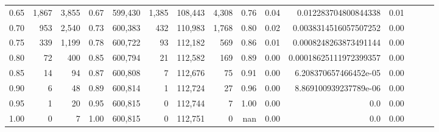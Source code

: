 \begin{tabular}{rrrrrrrrrrrrrrr}
0.65 &    1,867 &   3,855 &  0.67 &  599,430 &    1,385 &  108,443 &    4,308 &  0.76 &  0.04 &    0.012283704800844338 &      0.01 \\
0.70 &      953 &   2,540 &  0.73 &  600,383 &      432 &  110,983 &    1,768 &  0.80 &  0.02 &   0.0038314516057507252 &      0.00 \\
0.75 &      339 &   1,199 &  0.78 &  600,722 &       93 &  112,182 &      569 &  0.86 &  0.01 &   0.0008248263873491144 &      0.00 \\
0.80 &       72 &     400 &  0.85 &  600,794 &       21 &  112,582 &      169 &  0.89 &  0.00 &  0.00018625111972399357 &      0.00 \\
0.85 &       14 &      94 &  0.87 &  600,808 &        7 &  112,676 &       75 &  0.91 &  0.00 &   6.208370657466452e-05 &      0.00 \\
0.90 &        6 &      48 &  0.89 &  600,814 &        1 &  112,724 &       27 &  0.96 &  0.00 &   8.869100939237789e-06 &      0.00 \\
0.95 &        1 &      20 &  0.95 &  600,815 &        0 &  112,744 &        7 &  1.00 &  0.00 &                     0.0 &      0.00 \\
1.00 &        0 &       7 &  1.00 &  600,815 &        0 &  112,751 &        0 &   nan &  0.00 &                     0.0 &      0.00 \\
\bottomrule
\end{tabular}
